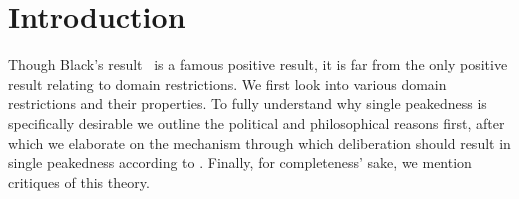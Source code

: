 \newpage
\chapter{Introduction}
\label{Introduction}

Though Black's result~\citep{blackRationaleGroupDecisionmaking1948} is a famous positive result, it is far from the only positive result relating to domain restrictions. We first look into various domain restrictions and their properties. To fully understand why single peakedness is specifically desirable we outline the political and philosophical reasons first, after which we elaborate on the mechanism through which deliberation should result in single peakedness according to \citet{listTwoConceptsAgreement2002}. Finally, for completeness' sake, we mention critiques of this theory.

%
%
%
%
%
%
%
%
